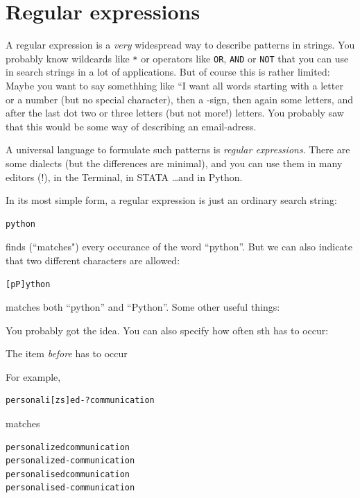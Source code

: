 \documentclass[a4paper,12pt]{book}
\renewcommand{\texttt}[1]{%
  \begingroup
  \ttfamily
  \begingroup\lccode`~=`/\lowercase{\endgroup\def~}{/\discretionary{}{}{}}%
  \begingroup\lccode`~=`[\lowercase{\endgroup\def~}{[\discretionary{}{}{}}%
  \begingroup\lccode`~=`.\lowercase{\endgroup\def~}{.\discretionary{}{}{}}%
  \begingroup\lccode`~=`(\lowercase{\endgroup\def~}{(\discretionary{}{}{}}%
  \catcode`/=\active\catcode`[=\active\catcode`.=\active\catcode`(=\active
  \scantokens{#1\noexpand}%
  \endgroup
}
\begin{document}
\section{Regular expressions}

A regular expression is a \emph{very} widespread way to describe patterns in strings. You probably know wildcards like {\tt{*}} or operators like {\tt{OR}}, {\tt{AND}} or {\tt{NOT}} that you can use in search strings in a lot of applications. But of course this is rather limited: Maybe you want to say somethhing like ``I want all words starting with a letter or a number (but no special character), then a \@-sign, then again some letters, and after the last dot two or three letters (but not more!) letters. You probably saw that this would be some way of describing an email-adress. 

A universal language to formulate such patterns is \emph{regular expressions}. There are some dialects (but the differences are minimal), and you can use them in many editors (!), in the Terminal, in STATA \ldots and in Python.

In its most simple form, a regular expression is just an ordinary search string:
\begin{lstlisting}
python
\end{lstlisting}
finds (``matches") every occurance of the word ``python''. But we can also indicate that two different characters are allowed:
\begin{lstlisting}
[pP]ython
\end{lstlisting}
matches both ``python'' and ``Python''. Some other useful things:


You probably got the idea. You can also specify how often sth has to occur:

The item \emph{before} has to occur
For example,
\begin{lstlisting}
personali[zs]ed-?communication
\end{lstlisting}
matches 
\begin{lstlisting}
personalizedcommunication
personalized-communication
personalisedcommunication
personalised-communication
\end{lstlisting}
\end{document}
